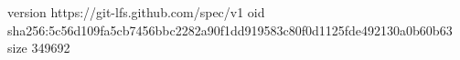 version https://git-lfs.github.com/spec/v1
oid sha256:5c56d109fa5cb7456bbc2282a90f1dd919583c80f0d1125fde492130a0b60b63
size 349692
